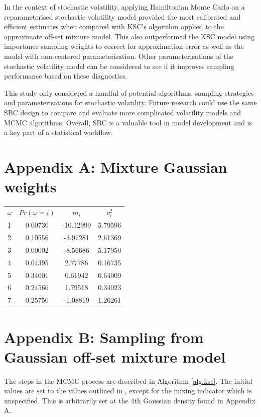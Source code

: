 \documentclass[12pt, a4paper]{article}
\begin{document}
In the context of stochastic volatility, applying Hamiltonian Monte Carlo on a reparameterised stochastic volatility model provided the most calibrated and efficient estimates when compared with KSC's algorithm applied to the approximate off-set mixture model. This also outperformed the KSC model using importance sampling weights to correct for approximation error as well as the model with non-centered parameterisation. Other parameterisations of the stochastic volatility model can be considered to see if it improves sampling performance based on these diagnostics. 

This study only considered a handful of potential algorithms, sampling strategies and parameterisations for stochastic volatility. Future research could use the same SBC design to compare and evaluate more complicated volatility models and MCMC algorithms. Overall, SBC is a valuable tool in model development and is a key part of a statistical workflow. 
 
\newpage



\newpage

\section{Appendix A: Mixture Gaussian weights}

\begin{table}[H]
    \centering
    \begin{tabular}{lccc} 
          $\omega$ &$Pr(\omega = i)$&  $m_i$&  $\nu^2_i$\\ 
          1&0.00730  &  -10.12999&  5.79596\\ 
          2&0.10556  &   -3.97281 &  2.61369\\ 
          3&0.00002 &  -8.56686 &   5.17950\\ 
          4&0.04395 &  2.77786  &   0.16735 \\ 
          5&0.34001&   0.61942    &  0.64009\\ 
          6&0.24566 &  1.79518    &  0.34023 \\ 
          7&0.25750 &  -1.08819    &  1.26261\\ 
    \end{tabular} 
\end{table}

\newpage

\section{Appendix B: Sampling from Gaussian off-set mixture model}
    The steps in the MCMC process are described in Algorithm \ref{alg:ksc}. The initial values are set to the values outlined in \citet{kim1998stochastic}, except for the mixing indicator which is unspecified. This is arbitrarily set at the 4th Gaussian density found in Appendix A. 
        
\end{document}
